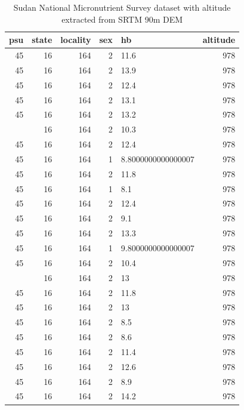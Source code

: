 \documentclass[12pt,a4paper]{article}
\begin{document}
\begin{table}[H]

\caption{\label{tab:elevation2}Sudan National Micronutrient Survey dataset with altitude extracted from SRTM 90m DEM}
\centering
\begin{tabular}[t]{rrrrlr}
\toprule
\textbf{psu} & \textbf{state} & \textbf{locality} & \textbf{sex} & \textbf{hb} & \textbf{altitude}\\
\midrule
\rowcolor{gray!6}  45 & 16 & 164 & 2 & 11.6 & \vphantom{1} 978\\
45 & 16 & 164 & 2 & 13.9 & 978\\
\rowcolor{gray!6}  45 & 16 & 164 & 2 & 12.4 & \vphantom{2} 978\\
45 & 16 & 164 & 2 & 13.1 & 978\\
\rowcolor{gray!6}  45 & 16 & 164 & 2 & 13.2 & 978\\
\addlinespace
45 & 16 & 164 & 2 & 10.3 & 978\\
\rowcolor{gray!6}  45 & 16 & 164 & 2 & 12.4 & \vphantom{1} 978\\
45 & 16 & 164 & 1 & 8.8000000000000007 & 978\\
\rowcolor{gray!6}  45 & 16 & 164 & 2 & 11.8 & \vphantom{1} 978\\
45 & 16 & 164 & 1 & 8.1 & 978\\
\addlinespace
\rowcolor{gray!6}  45 & 16 & 164 & 2 & 12.4 & \vphantom{2} 978\\
45 & 16 & 164 & 2 & 9.1 & 978\\
\rowcolor{gray!6}  45 & 16 & 164 & 2 & 13.3 & 978\\
45 & 16 & 164 & 1 & 9.8000000000000007 & 978\\
\rowcolor{gray!6}  45 & 16 & 164 & 2 & 10.4 & 978\\
\addlinespace
45 & 16 & 164 & 2 & 13 & \vphantom{1} 978\\
\rowcolor{gray!6}  45 & 16 & 164 & 2 & 11.8 & \vphantom{1} 978\\
45 & 16 & 164 & 2 & 13 & \vphantom{1} 978\\
\rowcolor{gray!6}  45 & 16 & 164 & 2 & 8.5 & 978\\
45 & 16 & 164 & 2 & 8.6 & 978\\
\addlinespace
\rowcolor{gray!6}  45 & 16 & 164 & 2 & 11.4 & 978\\
45 & 16 & 164 & 2 & 12.6 & 978\\
\rowcolor{gray!6}  45 & 16 & 164 & 2 & 8.9 & 978\\
45 & 16 & 164 & 2 & 14.2 & 978\\

\end{tabular}
\end{table}
\end{document}
